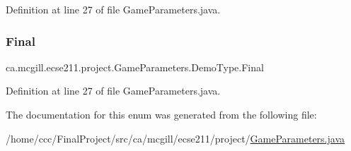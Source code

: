 Definition at line 27 of file Game\+Parameters.\+java.

\mbox{\label{enumca_1_1mcgill_1_1ecse211_1_1project_1_1_game_parameters_1_1_demo_type_a1ba3e060bfd5f76af77b713321abc7f6}} 
\subsubsection{\texorpdfstring{Final}{Final}}
{\footnotesize\ttfamily ca.\+mcgill.\+ecse211.\+project.\+Game\+Parameters.\+Demo\+Type.\+Final}



Definition at line 27 of file Game\+Parameters.\+java.



The documentation for this enum was generated from the following file\+:\begin{DoxyCompactItemize}
\item 
/home/ccc/\+Final\+Project/src/ca/mcgill/ecse211/project/\hyperlink{_game_parameters_8java}{Game\+Parameters.\+java}\end{DoxyCompactItemize}
